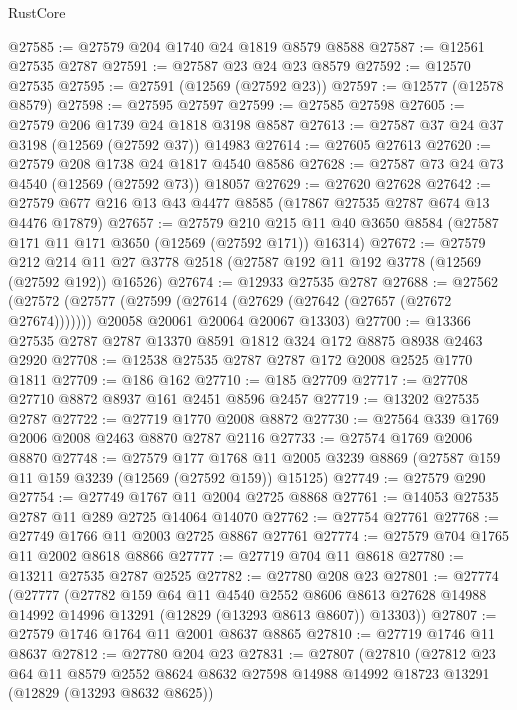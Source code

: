 \begin{lexlean}{RustCore}
\begin{coremodule}
@27585 := @27579 @204 @1740 @24 @1819 @8579 @8588
@27587 := @12561 @27535 @2787
@27591 := @27587 @23 @24 @23 @8579
@27592 := @12570 @27535
@27595 := @27591 (@12569 (@27592 @23))
@27597 := @12577 (@12578 @8579)
@27598 := @27595 @27597
@27599 := @27585 @27598
@27605 := @27579 @206 @1739 @24 @1818 @3198 @8587
@27613 := @27587 @37 @24 @37 @3198 (@12569 (@27592 @37)) @14983
@27614 := @27605 @27613
@27620 := @27579 @208 @1738 @24 @1817 @4540 @8586
@27628 := @27587 @73 @24 @73 @4540 (@12569 (@27592 @73)) @18057
@27629 := @27620 @27628
@27642 := @27579 @677 @216 @13 @43 @4477 @8585 (@17867 @27535 @2787 @674 @13 @4476 @17879)
@27657 := @27579
    @210
    @215
    @11
    @40
    @3650
    @8584
    (@27587 @171 @11 @171 @3650 (@12569 (@27592 @171)) @16314)
@27672 := @27579
    @212
    @214
    @11
    @27
    @3778
    @2518
    (@27587 @192 @11 @192 @3778 (@12569 (@27592 @192)) @16526)
@27674 := @12933 @27535 @2787
@27688 := @27562
    (@27572
      (@27577 (@27599 (@27614 (@27629 (@27642 (@27657 (@27672 @27674)))))))
      @20058
      @20061
      @20064
      @20067
      @13303)
@27700 := @13366 @27535 @2787 @2787 @13370 @8591 @1812 @324 @172 @8875 @8938 @2463 @2920
@27708 := @12538 @27535 @2787 @2787 @172 @2008 @2525 @1770 @1811
@27709 := @186 @162
@27710 := @185 @27709
@27717 := @27708 @27710 @8872 @8937 @161 @2451 @8596 @2457
@27719 := @13202 @27535 @2787
@27722 := @27719 @1770 @2008 @8872
@27730 := @27564 @339 @1769 @2006 @2008 @2463 @8870 @2787 @2116
@27733 := @27574 @1769 @2006 @8870
@27748 := @27579
    @177
    @1768
    @11
    @2005
    @3239
    @8869
    (@27587 @159 @11 @159 @3239 (@12569 (@27592 @159)) @15125)
@27749 := @27579 @290
@27754 := @27749 @1767 @11 @2004 @2725 @8868
@27761 := @14053 @27535 @2787 @11 @289 @2725 @14064 @14070
@27762 := @27754 @27761
@27768 := @27749 @1766 @11 @2003 @2725 @8867 @27761
@27774 := @27579 @704 @1765 @11 @2002 @8618 @8866
@27777 := @27719 @704 @11 @8618
@27780 := @13211 @27535 @2787 @2525
@27782 := @27780 @208 @23
@27801 := @27774
    (@27777
      (@27782
        @159
        @64
        @11
        @4540
        @2552
        @8606
        @8613
        @27628
        @14988
        @14992
        @14996
        @13291
        (@12829 (@13293 @8613 @8607))
        @13303))
@27807 := @27579 @1746 @1764 @11 @2001 @8637 @8865
@27810 := @27719 @1746 @11 @8637
@27812 := @27780 @204 @23
@27831 := @27807
    (@27810
      (@27812
        @23
        @64
        @11
        @8579
        @2552
        @8624
        @8632
        @27598
        @14988
        @14992
        @18723
        @13291
        (@12829 (@13293 @8632 @8625))

\end{coremodule}
\end{lexlean}
